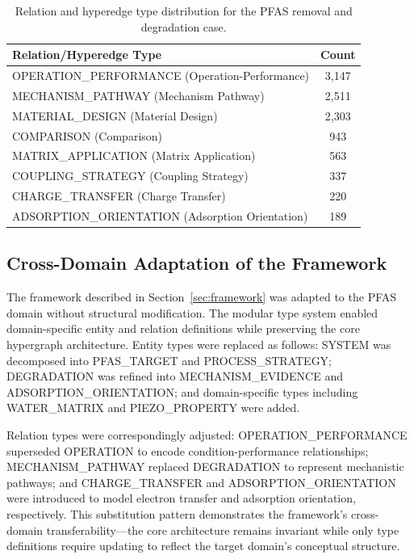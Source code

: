 \begin{table}[htbp]
\centering
\caption{Relation and hyperedge type distribution for the PFAS removal and degradation case.}
\label{tab:pfas_relation_types}
\begin{tabular}{@{}lc@{}}
\toprule
\textbf{Relation/Hyperedge Type} & \textbf{Count} \\
\midrule
OPERATION\_PERFORMANCE (Operation-Performance) & 3,147 \\
MECHANISM\_PATHWAY (Mechanism Pathway) & 2,511 \\
MATERIAL\_DESIGN (Material Design) & 2,303 \\
COMPARISON (Comparison) & 943 \\
MATRIX\_APPLICATION (Matrix Application) & 563 \\
COUPLING\_STRATEGY (Coupling Strategy) & 337 \\
CHARGE\_TRANSFER (Charge Transfer) & 220 \\
ADSORPTION\_ORIENTATION (Adsorption Orientation) & 189 \\
\bottomrule
\end{tabular}
\end{table}

\subsection{Cross-Domain Adaptation of the Framework}

The framework described in Section~\ref{sec:framework} was adapted to the PFAS domain without structural modification. The modular type system enabled domain-specific entity and relation definitions while preserving the core hypergraph architecture. Entity types were replaced as follows: SYSTEM was decomposed into PFAS\_TARGET and PROCESS\_STRATEGY; DEGRADATION was refined into MECHANISM\_EVIDENCE and ADSORPTION\_ORIENTATION; and domain-specific types including WATER\_MATRIX and PIEZO\_PROPERTY were added.

Relation types were correspondingly adjusted: OPERATION\_PERFORMANCE superseded OPERATION to encode condition-performance relationships; MECHANISM\_PATHWAY replaced DEGRADATION to represent mechanistic pathways; and CHARGE\_TRANSFER and ADSORPTION\_ORIENTATION were introduced to model electron transfer and adsorption orientation, respectively. This substitution pattern demonstrates the framework's cross-domain transferability---the core architecture remains invariant while only type definitions require updating to reflect the target domain's conceptual structure.


